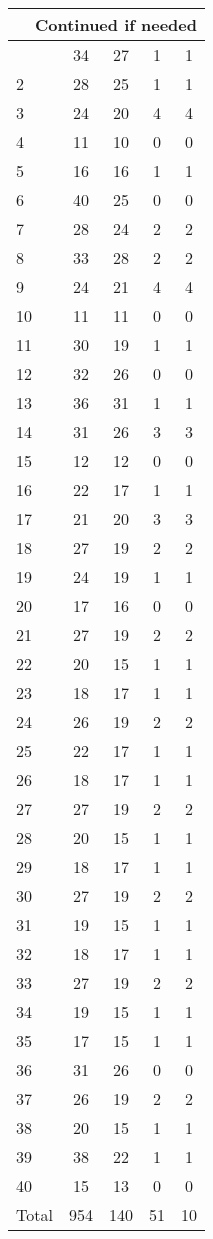 \begin{center}
\begin{longtable}{l|c|c|c|c}
\hline \multicolumn{5}{|r|}{{Continued if needed}} \\ \hline
\endfoot 
1 & 34 & 27 & 1 & 1\\ \hline
2 & 28 & 25 & 1 & 1\\ \hline
3 & 24 & 20 & 4 & 4\\ \hline
4 & 11 & 10 & 0 & 0\\ \hline
5 & 16 & 16 & 1 & 1\\ \hline
6 & 40 & 25 & 0 & 0\\ \hline
7 & 28 & 24 & 2 & 2\\ \hline
8 & 33 & 28 & 2 & 2\\ \hline
9 & 24 & 21 & 4 & 4\\ \hline
10 & 11 & 11 & 0 & 0\\ \hline
11 & 30 & 19 & 1 & 1\\ \hline
12 & 32 & 26 & 0 & 0\\ \hline
13 & 36 & 31 & 1 & 1\\ \hline
14 & 31 & 26 & 3 & 3\\ \hline
15 & 12 & 12 & 0 & 0\\ \hline
16 & 22 & 17 & 1 & 1\\ \hline
17 & 21 & 20 & 3 & 3\\ \hline
18 & 27 & 19 & 2 & 2\\ \hline
19 & 24 & 19 & 1 & 1\\ \hline
20 & 17 & 16 & 0 & 0\\ \hline
21 & 27 & 19 & 2 & 2\\ \hline
22 & 20 & 15 & 1 & 1\\ \hline
23 & 18 & 17 & 1 & 1\\ \hline
24 & 26 & 19 & 2 & 2\\ \hline
25 & 22 & 17 & 1 & 1\\ \hline
26 & 18 & 17 & 1 & 1\\ \hline
27 & 27 & 19 & 2 & 2\\ \hline
28 & 20 & 15 & 1 & 1\\ \hline
29 & 18 & 17 & 1 & 1\\ \hline
30 & 27 & 19 & 2 & 2\\ \hline
31 & 19 & 15 & 1 & 1\\ \hline
32 & 18 & 17 & 1 & 1\\ \hline
33 & 27 & 19 & 2 & 2\\ \hline
34 & 19 & 15 & 1 & 1\\ \hline
35 & 17 & 15 & 1 & 1\\ \hline
36 & 31 & 26 & 0 & 0\\ \hline
37 & 26 & 19 & 2 & 2\\ \hline
38 & 20 & 15 & 1 & 1\\ \hline
39 & 38 & 22 & 1 & 1\\ \hline
40 & 15 & 13 & 0 & 0\\ \hline
Total & 954 & 140 & 51 & 10
\end{longtable}
\end{center}



